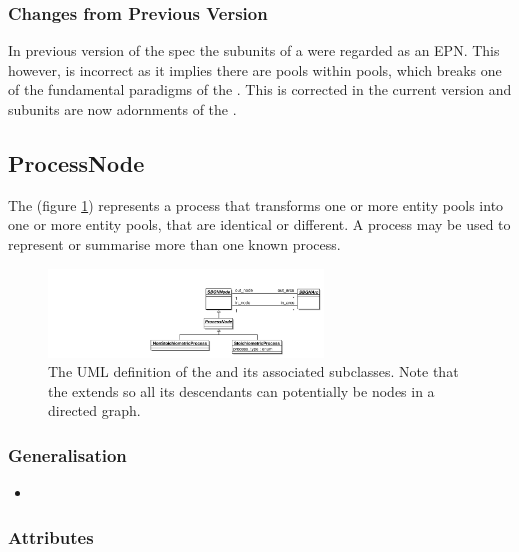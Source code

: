 \subsubsection{Changes from Previous Version}

In previous version of the spec the subunits of a 
were regarded as an EPN. This however, is incorrect as it implies
there are pools within pools, which breaks one of the fundamental
paradigms of the \PDl. This is corrected in the current version and
subunits are now adornments of the .

\subsection{ProcessNode}\label{sec:PNs}
\label{defn:ProcessNode}

The  (figure \ref{fig:processumlview}) represents a
process that transforms one or more entity pools into one or more
entity pools, that are identical or different. A process may be used
to represent or summarise more than one known process.

\begin{figure}[htb]
  \centering
  \includegraphics[width = 0.65\textwidth]{images/processumlview}
  \caption{The UML definition of the  and its
    associated subclasses. Note that the  extends
     so all its descendants can potentially be
    nodes in a directed graph.}
  \label{fig:processumlview}
\end{figure}


\subsubsection{Generalisation}

\begin{itemize}
\item {}
\end{itemize}

\subsubsection{Attributes}

